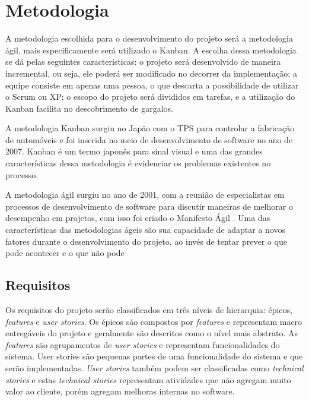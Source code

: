 \chapter[Metodologia]{Metodologia}
A metodologia escolhida para o desenvolvimento do projeto será a metodologia ágil, mais especificamente será utilizado o Kanban. A escolha dessa metodologia se dá pelas seguintes características: o projeto será desenvolvido de maneira incremental, ou seja, ele poderá ser modificado no decorrer da implementação; a equipe consiste em apenas uma pessoa, o que descarta a possibilidade de utilizar o Scrum ou XP; o escopo do projeto será divididos em tarefas, e a utilização do Kanban facilita no descobrimento de gargalos.

A metodologia Kanban surgiu no Japão com o TPS \cite{tps} para controlar a fabricação de automóveis e foi inserida no meio de desenvolvimento de software no ano de 2007. Kanban é um termo japonês para sinal visual e uma das grandes características dessa metodologia é evidenciar os problemas existentes no processo. 

A metodologia ágil surgiu no ano de 2001, com a reunião de especialistas em processos de desenvolvimento de software para discutir maneiras de melhorar o desempenho em projetos, com isso foi criado o Manifesto Ágil \cite{agil}. Uma das características das metodologias ágeis são sua capacidade de adaptar a novos fatores durante o desenvolvimento do projeto, ao invés de tentar prever o que pode acontecer e o que não pode
\section{Requisitos}
Os requisitos do projeto serão classificados em três níveis de hierarquia:  épicos, \textit{features} e \textit{user stories}. Os épicos são compostos por \textit{features} e representam macro entregáveis do projeto e geralmente são descritos como o nível mais abstrato. As \textit{features} são agrupamentos de \textit{user stories} e representam funcionalidades do sistema. User stories são pequenas partes de uma funcionalidade do sistema e que serão implementadas. \textit{User stories} também podem ser classificadas como \textit{technical stories} e estas \textit{technical stories} representam atividades que não agregam muito valor ao cliente, porém agregam melhoras internas no software.

